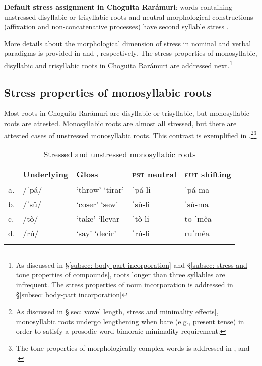 \ea\label{ex: default stress assignment in CR}

\textbf{Default stress assignment in Choguita Rarámuri}: words containing unstressed disyllabic or trisyllabic roots and neutral morphological constructions (affixation and non-concatenative processes) have second syllable stress \parencite{caballero2011morphologically}.

\z

More details about the morphological dimension of stress in nominal and verbal paradigms is provided in   and , respectively. The stress properties of monosyllabic, disyllabic and trisyllabic roots in Choguita Rarámuri are addressed next.\footnote{As discussed in §\ref{subsec: body-part incorporation} and §\ref{subsec: stress and tone properties of compounds}, roots longer than three syllables are infrequent. The stress properties of noun incorporation is addressed in §\ref{subsec: body-part incorporation}}

\subsection{Stress properties of monosyllabic roots}
\label{subsec: stress properties of monosyllabic roots}

Most roots in Choguita Rarámuri are disyllabic or trisyllabic, but monosyllabic roots are attested. Monosyllabic roots are almost all stressed, but there are attested cases of unstressed monosyllabic roots. This contrast is exemplified in .\footnote{As discussed in §\ref{sec: vowel length, stress and minimality effects}, monosyllabic roots undergo lengthening when bare (e.g., present tense) in order to satisfy a prosodic word bimoraic minimality requirement.}\footnote{The tone properties of morphologically complex words is addressed in ,  and .}

\begin{table}
\caption{Stressed and unstressed monosyllabic roots}
\label{tab:monosyllabic-stressed-unstressed}

\begin{tabularx}{\textwidth}{lXXXl}
\lsptoprule
&\textbf{Underlying} & \textbf{Gloss} & \textbf{\textsc{pst} neutral}  & \textbf{\textsc{fut} shifting} \\
\midrule
a.& /ˈpá/ &   `throw’ `tirar’ & ˈpá-li  & ˈpá-ma \\
b.& /ˈsû/  & `coser' `sew'  & ˈsû-li &    ˈsû-ma  \\
c.& /tò/ &    `take’ `llevar &     ˈtò-li  &   to-ˈmêa   \\
d.& /rú/  &  `say' `decir'    &   ˈrú-li    &    ruˈmêa  \\
\lspbottomrule
\end{tabularx}
\end{table}

